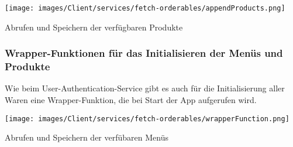 \begin{code}
    \centering
    \texttt{[image: images/Client/services/fetch-orderables/appendProducts.png]}
    \caption{Abrufen und Speichern der verfügbaren Produkte}
\end{code}

\subsubsection{Wrapper-Funktionen für das Initialisieren der Menüs und Produkte}

Wie beim User-Authentication-Service gibt es auch für die Initialisierung aller Waren eine Wrapper-Funktion,
die bei Start der App aufgerufen wird.

\begin{code}
    \centering
    \texttt{[image: images/Client/services/fetch-orderables/wrapperFunction.png]}
    \caption{Abrufen und Speichern der verfübaren Menüs}
\end{code}

\newpage